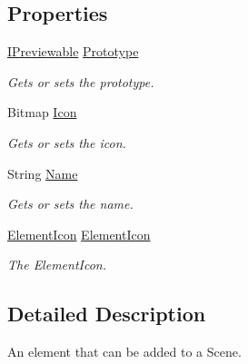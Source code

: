 \subsection*{Properties}
\begin{DoxyCompactItemize}
\item 
\hyperlink{interface_a_rdev_kit_1_1_model_1_1_project_1_1_i_previewable}{I\-Previewable} \hyperlink{class_a_rdev_kit_1_1_controller_1_1_editor_controller_1_1_scene_element_a03fd9bd9f7ca766c534b7c6400006a55}{Prototype}
\begin{DoxyCompactList}\small\item\em Gets or sets the prototype. \end{DoxyCompactList}\item 
Bitmap \hyperlink{class_a_rdev_kit_1_1_controller_1_1_editor_controller_1_1_scene_element_ac20376b4582ba5df3b65aaf2c4f84b9b}{Icon}
\begin{DoxyCompactList}\small\item\em Gets or sets the icon. \end{DoxyCompactList}\item 
String \hyperlink{class_a_rdev_kit_1_1_controller_1_1_editor_controller_1_1_scene_element_a815f4b956410f110fa82889e863e6800}{Name}
\begin{DoxyCompactList}\small\item\em Gets or sets the name. \end{DoxyCompactList}\item 
\hyperlink{class_a_rdev_kit_1_1_view_1_1_element_icon}{Element\-Icon} \hyperlink{class_a_rdev_kit_1_1_controller_1_1_editor_controller_1_1_scene_element_ae58c1e51ff8bfd942670b7c4afd2b2ce}{Element\-Icon}
\begin{DoxyCompactList}\small\item\em The Element\-Icon. \end{DoxyCompactList}\end{DoxyCompactItemize}


\subsection{Detailed Description}
An element that can be added to a Scene. 

